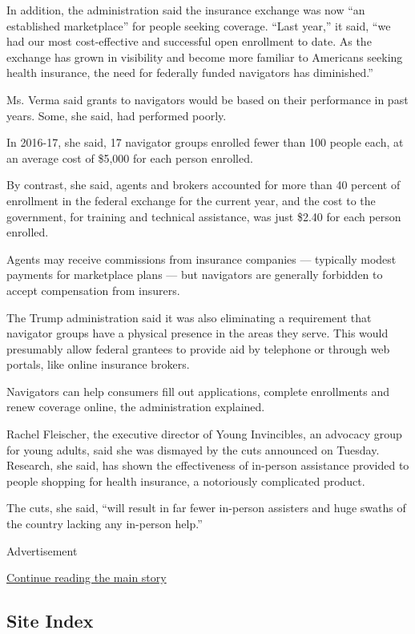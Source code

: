In addition, the administration said the insurance exchange was now ``an
established marketplace'' for people seeking coverage. ``Last year,'' it
said, ``we had our most cost-effective and successful open enrollment to
date. As the exchange has grown in visibility and become more familiar
to Americans seeking health insurance, the need for federally funded
navigators has diminished.''

Ms. Verma said grants to navigators would be based on their performance
in past years. Some, she said, had performed poorly.

In 2016-17, she said, 17 navigator groups enrolled fewer than 100 people
each, at an average cost of \$5,000 for each person enrolled.

By contrast, she said, agents and brokers accounted for more than 40
percent of enrollment in the federal exchange for the current year, and
the cost to the government, for training and technical assistance, was
just \$2.40 for each person enrolled.

Agents may receive commissions from insurance companies --- typically
modest payments for marketplace plans --- but navigators are generally
forbidden to accept compensation from insurers.

The Trump administration said it was also eliminating a requirement that
navigator groups have a physical presence in the areas they serve. This
would presumably allow federal grantees to provide aid by telephone or
through web portals, like online insurance brokers.

Navigators can help consumers fill out applications, complete
enrollments and renew coverage online, the administration explained.

Rachel Fleischer, the executive director of Young Invincibles, an
advocacy group for young adults, said she was dismayed by the cuts
announced on Tuesday. Research, she said, has shown the effectiveness of
in-person assistance provided to people shopping for health insurance, a
notoriously complicated product.

The cuts, she said, ``will result in far fewer in-person assisters and
huge swaths of the country lacking any in-person help.''

Advertisement

\protect\hyperlink{after-bottom}{Continue reading the main story}

\hypertarget{site-index}{%
\subsection{Site Index}\label{site-index}}

